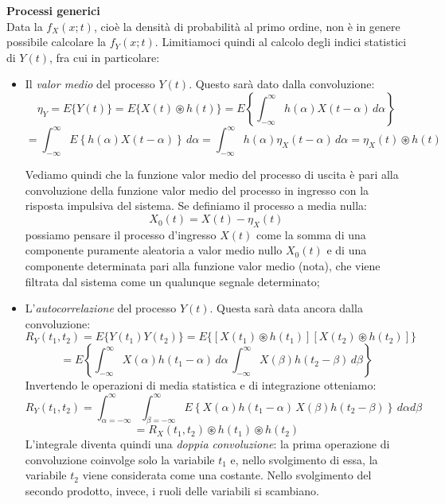 \documentclass[a4paper,11pt]{article}
\begin{document}
\par\smallskip
\noindent
\textbf{\textsf{Processi generici}} \\
\noindent
Data la $f_X(x;t)$, cioè la densità di probabilità al primo ordine, non è in genere possibile calcolare la $f_Y(x;t)$. Limitiamoci quindi al calcolo degli indici statistici di $Y(t)$, fra cui in particolare:
\begin{itemize}
\item Il \textit{valor medio} del processo $Y(t)$. Questo sarà dato dalla convoluzione: 
$$
\eta_Y = E\{Y(t)\} = E\{X(t) \circledast h(t)\} = E \left\{ \int_{-\infty}^{\infty} h(\alpha) X(t - \alpha) \, d\alpha \right\} 
$$
$$
= \int_{-\infty}^{\infty} E\left\{ h(\alpha) X(t - \alpha) \right\} \, d\alpha = \int_{-\infty}^{\infty} h(\alpha) \eta_X(t - \alpha) \, d\alpha = \eta_X(t) \circledast h(t)
$$

Vediamo quindi che la funzione valor medio del processo di uscita è pari alla convoluzione della funzione valor medio del processo in ingresso con la risposta impulsiva del sistema. Se definiamo il processo a media nulla:
$$
X_0(t) = X(t) - \eta_X(t)
$$
possiamo pensare il processo d’ingresso $X(t)$ come la somma di una componente puramente aleatoria a valor medio nullo $X_0(t)$ e di una componente determinata pari alla funzione valor medio (nota), che viene filtrata dal sistema come un qualunque segnale determinato;
\item L'\textit{autocorrelazione} del processo $Y(t)$. Questa sarà data ancora dalla convoluzione:
$$
R_Y(t_1, t_2) = E\{ Y(t_1) Y(t_2) \} = E\{ \left[ X(t_1) \circledast h(t_1) \right] \left[ X(t_2) \circledast h(t_2) \right] \}
$$
$$
= E \left\{ \int_{-\infty}^{\infty} X(\alpha) h(t_1 - \alpha) \, d\alpha \, \int_{-\infty}^{\infty} X(\beta) h(t_2 - \beta) \, d\beta \right\}
$$
Invertendo le operazioni di media statistica e di integrazione otteniamo:
$$
R_Y(t_1, t_2) = \int_{\alpha=-\infty}^{\infty} \int_{\beta=-\infty}^{\infty} 
E \left\{  X(\alpha) h(t_1 - \alpha) \, X(\beta) h(t_2 - \beta) \right\} \, d\alpha d\beta 
$$
$$
= R_X(t_1, t_2) \circledast h(t_1) \circledast h(t_2) 
$$
L’integrale diventa quindi una \textit{doppia convoluzione}: la prima operazione di convoluzione coinvolge solo la variabile $t_1$ e, nello svolgimento di essa, la variabile $t_2$ viene considerata come una costante. Nello svolgimento del secondo prodotto, invece, i ruoli delle variabili si scambiano.
\end{itemize}
\end{document}
